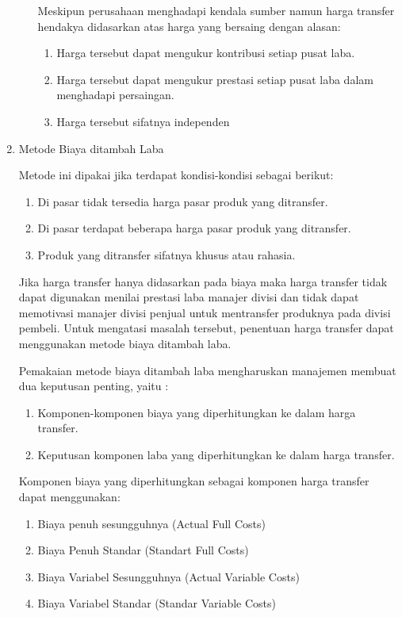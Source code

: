\begin{enumerate}
\begin{enumerate}
		Meskipun perusahaan menghadapi kendala sumber namun harga transfer hendakya didasarkan atas harga yang bersaing dengan alasan:

		\begin{enumerate}
			\item Harga tersebut dapat mengukur kontribusi setiap pusat laba.
			\item Harga tersebut dapat mengukur prestasi setiap pusat laba dalam menghadapi persaingan.
			\item Harga tersebut sifatnya independen
		\end{enumerate}
	\end{enumerate}

	\item Metode Biaya ditambah Laba
	
	Metode ini dipakai jika terdapat kondisi-kondisi sebagai berikut:

	\begin{enumerate}
		\item Di pasar tidak tersedia harga pasar produk yang ditransfer.
		\item Di pasar terdapat beberapa harga pasar produk yang ditransfer.
		\item Produk yang ditransfer sifatnya khusus atau rahasia.
	\end{enumerate}

	Jika harga transfer hanya didasarkan pada biaya maka harga transfer tidak dapat digunakan menilai prestasi laba manajer divisi dan tidak dapat memotivasi manajer divisi penjual untuk mentransfer produknya pada divisi pembeli. Untuk mengatasi masalah tersebut, penentuan harga transfer dapat menggunakan metode biaya ditambah laba.

	Pemakaian metode biaya ditambah laba mengharuskan manajemen membuat dua keputusan penting, yaitu :

	\begin{enumerate}
		\item Komponen-komponen biaya yang diperhitungkan ke dalam harga transfer.
		\item Keputusan komponen laba yang diperhitungkan ke dalam harga transfer.
	\end{enumerate}

	Komponen biaya yang diperhitungkan sebagai komponen harga transfer dapat menggunakan:

	\begin{enumerate}
		\item Biaya penuh sesungguhnya (Actual Full Costs)
		\item Biaya Penuh Standar (Standart Full Costs)
		\item  Biaya Variabel Sesungguhnya (Actual Variable Costs)
		\item  Biaya Variabel Standar (Standar Variable Costs)
	\end{enumerate}


\end{enumerate}
